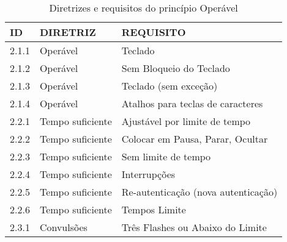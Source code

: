 \begin{table}[]
\center
\caption{Diretrizes e requisitos do princípio Operável}
\label{tab:operavel}
\begin{tabular}{lll}
\textbf{ID} & \textbf{DIRETRIZ}      & \textbf{REQUISITO}                              \\
\hline
 2.1.1           & Operável               & Teclado                                                                              \\
 
 2.1.2           & Operável               & Sem Bloqueio do Teclado                                                              \\
 
 2.1.3           & Operável               & Teclado (sem exceção)                                                               \\
 
 2.1.4           & Operável               & Atalhos para teclas de caracteres                                                    \\
 
 2.2.1           & Tempo suficiente       & Ajustável por limite de tempo                                                        \\
 
 2.2.2           & Tempo suficiente       & Colocar em Pausa, Parar, Ocultar                                                     \\
 
 2.2.3           & Tempo suficiente       & Sem limite de tempo                                                                 \\
 
 2.2.4           & Tempo suficiente       & Interrupções                                                                        \\
 
 2.2.5           & Tempo suficiente       & Re-autenticação (nova autenticação)                                                 \\
 
 2.2.6           & Tempo suficiente       & Tempos Limite                                                                       \\
 
 2.3.1           & Convulsões             & Três Flashes ou Abaixo do Limite                                                     \\
 

\end{tabular}
\end{table}
